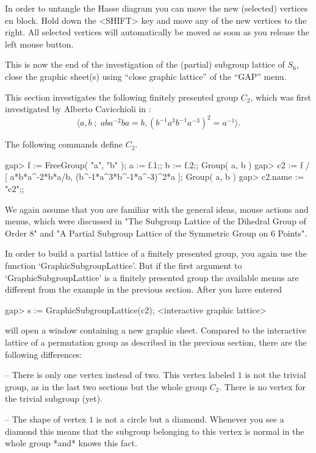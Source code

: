 In order  to untangle the Hasse diagram you  can  move the new (selected)
vertices  en block.  Hold down  the <SHIFT> key and   move any of the new
vertices to the right.  All selected vertices will automatically be moved
as soon as you release the left mouse button.

This is  now the  end  of the investigation   of  the (partial)  subgroup
lattice   of  $S_6$, close the    graphic  sheet(s) using  ``close graphic
lattice'' of the ``GAP'' menu.



This  section  investigates the  following  finitely presented group $C_2$,
which was first investigated by Alberto Cavicchioli in \cite{Cav86}:
$$
\langle a, b \;;\; aba^{-2}ba=b, (b^{-1}a^3b^{-1}a^{-3})^2=a^{-1}\rangle.
$$

The following {\GAP} commands define $C_2$.

\begintt
gap> f := FreeGroup( "a", "b" );  a := f.1;;  b := f.2;;
Group( a, b )
gap> c2 := f / [ a*b*a^-2*b*a/b, (b^-1*a^3*b^-1*a^-3)^2*a ];
Group( a, b )
gap> c2.name := "c2";; 
\endtt

We again assume that you are familiar with the general ideas, mouse actions
and menus, which were discussed in "The Subgroup Lattice of the Dihedral
Group of Order 8" and "A Partial Subgroup Lattice of the Symmetric Group on
6 Points".

In order  to build a  partial lattice of a  finitely presented group, you
again use the function  `GraphicSubgroup\-Lattice'.  But if the first  argument
to `GraphicSubgroupLattice' is a finitely presented group the available menus
are different  from the example in  the previous section.  After you have
entered

\begintt
gap> s := GraphicSubgroupLattice(c2);
<interactive graphic lattice> 
\endtt

{\XGAP} will open a window  containing a new  graphic sheet.  Compared to
the  interactive  lattice of  a permutation   group  as described  in the
previous section, there are the following differences:

-- There is only one  vertex instead of two.   This vertex labeled $1$ is
not the trivial  group, as in the last  two sections but  the whole group
$C_2$.  There is no vertex for the trivial subgroup (yet).

-- The shape of  vertex $1$ is not a  circle but a diamond.  Whenever you
see a diamond this  means that the subgroup  belonging to this vertex  is
normal in the whole group *and* {\GAP} knows this fact.

